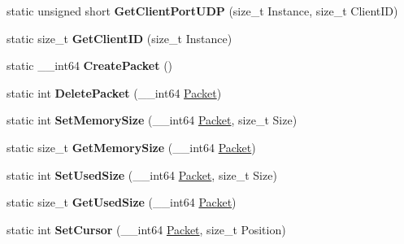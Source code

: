 \begin{DoxyCompactItemize}
\item 
\hypertarget{structmn_c_l_r_a6180addcba0fea241bc7ab2791aa0da6}{
static unsigned short {\bfseries GetClientPortUDP} (size\_\-t Instance, size\_\-t ClientID)}
\label{structmn_c_l_r_a6180addcba0fea241bc7ab2791aa0da6}

\item 
\hypertarget{structmn_c_l_r_ae0f632b58965054f0351537e487fefa6}{
static size\_\-t {\bfseries GetClientID} (size\_\-t Instance)}
\label{structmn_c_l_r_ae0f632b58965054f0351537e487fefa6}

\item 
\hypertarget{structmn_c_l_r_a9723c1aaff8d576bb1e228b492bf1c20}{
static \_\-\_\-int64 {\bfseries CreatePacket} ()}
\label{structmn_c_l_r_a9723c1aaff8d576bb1e228b492bf1c20}

\item 
\hypertarget{structmn_c_l_r_a66fb1ac74688a46fed0654862e92a462}{
static int {\bfseries DeletePacket} (\_\-\_\-int64 \hyperlink{class_packet}{Packet})}
\label{structmn_c_l_r_a66fb1ac74688a46fed0654862e92a462}

\item 
\hypertarget{structmn_c_l_r_abdb7fb02b5473cabaa143c9414cbf85c}{
static int {\bfseries SetMemorySize} (\_\-\_\-int64 \hyperlink{class_packet}{Packet}, size\_\-t Size)}
\label{structmn_c_l_r_abdb7fb02b5473cabaa143c9414cbf85c}

\item 
\hypertarget{structmn_c_l_r_a4d8f3f31887fd0c96bfdb593c6b0e091}{
static size\_\-t {\bfseries GetMemorySize} (\_\-\_\-int64 \hyperlink{class_packet}{Packet})}
\label{structmn_c_l_r_a4d8f3f31887fd0c96bfdb593c6b0e091}

\item 
\hypertarget{structmn_c_l_r_a666922ce25b19a09af68e5e9aabf25cf}{
static int {\bfseries SetUsedSize} (\_\-\_\-int64 \hyperlink{class_packet}{Packet}, size\_\-t Size)}
\label{structmn_c_l_r_a666922ce25b19a09af68e5e9aabf25cf}

\item 
\hypertarget{structmn_c_l_r_abae74bccf815eb8ab31d83e5dcad6d28}{
static size\_\-t {\bfseries GetUsedSize} (\_\-\_\-int64 \hyperlink{class_packet}{Packet})}
\label{structmn_c_l_r_abae74bccf815eb8ab31d83e5dcad6d28}

\item 
\hypertarget{structmn_c_l_r_a07be29761444e15847cc78c0c24a9c2d}{
static int {\bfseries SetCursor} (\_\-\_\-int64 \hyperlink{class_packet}{Packet}, size\_\-t Position)}
\label{structmn_c_l_r_a07be29761444e15847cc78c0c24a9c2d}


\end{DoxyCompactItemize}
